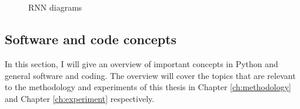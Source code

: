 \documentclass[report.tex]{subfiles}
\begin{document}
\begin{figure}[ht]
	\centering
	\\
	\\
	\caption{RNN diagrams}
	\label{fig:rnndiags}
\end{figure}

\newpagefill

\subsection{Software and code concepts}
\label{sec:softcode}

In this section, I will give an overview of important concepts in Python and general software and coding. The overview will cover the topics that are relevant to the methodology and experiments of this thesis in Chapter \ref{ch:methodology} and Chapter \ref{ch:experiment} respectively.
\end{document}
